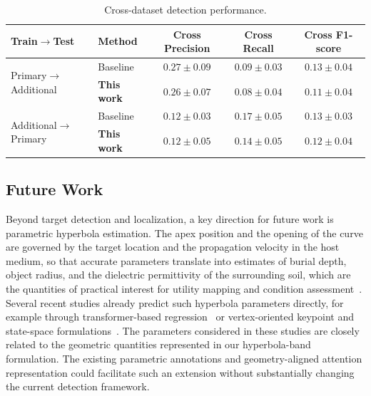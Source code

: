 \documentclass[lettersize,journal]{IEEEtran}
\begin{document}
\begin{table}[]
\caption{Cross-dataset detection performance.}
\label{tab:cross-dataset}
\centering
\setlength{\tabcolsep}{4pt}
\begin{tabular}{llccc}
\toprule
Train$\to$Test & Method & Cross Precision & Cross Recall & Cross F1-score \\
\midrule
\multirow{2}{*}{Primary$\to$Additional} & Baseline & $0.27 \pm 0.09$& $0.09 \pm 0.03$& $0.13 \pm 0.04$\\
 & \textbf{This work} & $\mathbf{0.26 \pm 0.07}$& $\mathbf{0.08 \pm 0.04}$& $\mathbf{0.11 \pm 0.04}$\\
\midrule
\multirow{2}{*}{Additional$\to$Primary} & Baseline & $0.12 \pm 0.03$& $0.17 \pm 0.05$& $0.13 \pm 0.03$\\
 & \textbf{This work} & $\mathbf{0.12 \pm 0.05}$& $\mathbf{0.14 \pm 0.05}$& $\mathbf{0.12 \pm 0.04}$\\
\bottomrule
\end{tabular}
\end{table}

\subsection{Future Work}
Beyond target detection and localization, a key direction for future work is parametric hyperbola estimation. 
The apex position and the opening of the curve are governed by the target location and the propagation velocity in the host medium, so that accurate parameters translate into estimates of burial depth, object radius, and the dielectric permittivity of the surrounding soil, which are the quantities of practical interest for utility mapping and condition assessment~\cite{liu2022pipeline}.
Several recent studies already predict such hyperbola parameters directly, for example through transformer-based regression~\cite{jin2024gprformer,ge2024gprtransunet} or vertex-oriented keypoint and state-space formulations~\cite{hou2025endtoend,lan2024statespace}.
The parameters considered in these studies are closely related to the geometric quantities represented in our hyperbola-band formulation. The existing parametric annotations and geometry-aligned attention representation could facilitate such an extension without substantially changing the current detection framework.
\end{document}
